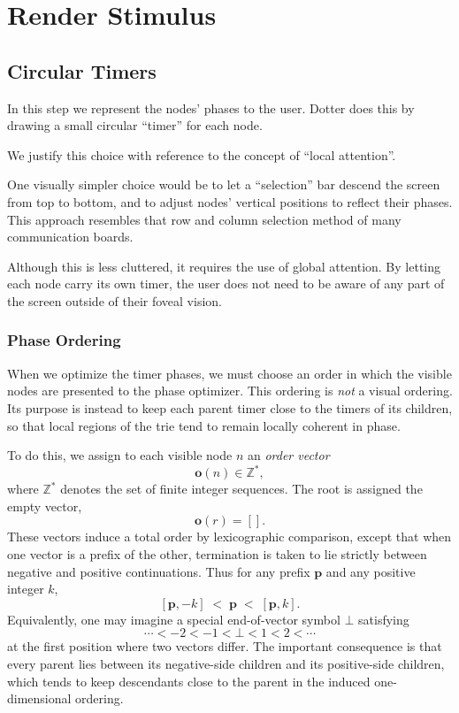 \chapter{Render Stimulus}
\label{chap:render-stimulus}

\section{Circular Timers}
In this step we represent the nodes' phases to the user.
Dotter does this by drawing a small circular ``timer'' for each node.

We justify this choice with reference to the concept of ``local attention''.

One visually simpler choice would be to let a ``selection'' bar descend the screen from top to bottom,
and to adjust nodes' vertical positions to reflect their phases.
This approach resembles that row and column selection method of many communication boards.

Although this is less cluttered, it requires the use of global attention.
By letting each node carry its own timer, the user does not need to be aware of any part of the screen
outside of their foveal vision.


\subsection{Phase Ordering}
When we optimize the timer phases, we must choose an order in which the visible
nodes are presented to the phase optimizer. This ordering is \emph{not} a visual
ordering. Its purpose is instead to keep each parent timer close to the timers of
its children, so that local regions of the trie tend to remain locally coherent
in phase.

To do this, we assign to each visible node $n$ an \emph{order vector}
\[
\mathbf{o}(n) \in \mathbb{Z}^*,
\]
where $\mathbb{Z}^*$ denotes the set of finite integer sequences. The root is
assigned the empty vector,
\[
\mathbf{o}(r) = [].
\]
These vectors induce a total order by lexicographic comparison, except that when
one vector is a prefix of the other, termination is taken to lie strictly
between negative and positive continuations. Thus for any prefix $\mathbf{p}$ and
any positive integer $k$,
\[
[\mathbf{p}, -k] \;<\; \mathbf{p} \;<\; [\mathbf{p}, k].
\]
Equivalently, one may imagine a special end-of-vector symbol $\bot$ satisfying
\[
\cdots < -2 < -1 < \bot < 1 < 2 < \cdots
\]
at the first position where two vectors differ. The important consequence is
that every parent lies between its negative-side children and its positive-side
children, which tends to keep descendants close to the parent in the induced
one-dimensional ordering.

